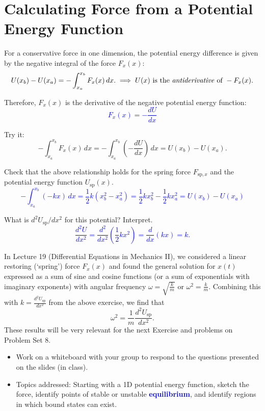 \documentclass[11pt, letterpaper, openany]{book}
\newenvironment{exercise}[1][Exercise]{%
  \tcolorbox[blanker, breakable, left=1em,
    before skip=1em, after skip=1em,
    borderline west={3pt}{0pt}{PhysNavy},
    colback=PhysCream,
    before upper={\textcolor{PhysNavy}{\sffamily\bfseries #1:}\space}
  ]%
}{%
  \endtcolorbox%
}
\begin{document}
\section*{Calculating Force from a Potential Energy Function}

For a conservative force in one dimension, the potential energy difference is given by the negative integral of the force $F_x(x)$:
\[ U(x_b) - U(x_a) = -\int_{x_a}^{x_b} F_x(x)\,dx. \implies U(x) \text{ is the \textit{antiderivative} of } -F_x(x). \]

Therefore, $F_x(x)$ is the derivative of the negative potential energy function:
\textcolor{blue}{\[ F_x(x) = -\frac{dU}{dx} \]}

Try it:
\[ -\int_{x_a}^{x_b} F_x(x)\,dx = -\int_{x_a}^{x_b} \left( -\frac{dU}{dx} \right)\,dx = U(x_b) - U(x_a). \]

\begin{exercise}[Exercise 3]
Check that the above relationship holds for the spring force $F_{\text{sp},x}$ and the potential energy function $U_{\text{sp}}(x)$. \\
\textcolor{blue}{
\[ -\int_{x_a}^{x_b} (-kx)\,dx = \frac{1}{2}k(x_b^2 - x_a^2) = \frac{1}{2}kx_b^2 - \frac{1}{2}kx_a^2 = U(x_b) - U(x_a) \]}

What is $d^2U_{\text{sp}}/dx^2$ for this potential? Interpret. \\
\textcolor{blue}{\[ \frac{d^2U}{dx^2} = \frac{d^2}{dx^2}\left(\frac{1}{2}kx^2\right) = \frac{d}{dx}(kx) = k. \]}
\end{exercise}

In Lecture 19 (Differential Equations in Mechanics II), we considered a linear restoring (`spring') force $F_x(x)$ and found the general solution for $x(t)$ expressed as a sum of sine and cosine functions (or a sum of exponentials with imaginary exponents) with angular frequency $\omega = \sqrt{\frac{k}{m}}$ or $\omega^2 = \frac{k}{m}$. Combining this with $k = \frac{d^2U_{\text{sp}}}{dx^2}$ from the above exercise, we find that
\[ \omega^2 = \frac{1}{m}\frac{d^2U_{\text{sp}}}{dx^2}. \]
These results will be very relevant for the next Exercise and problems on Problem Set 8.

\begin{exercise}[Exercise 4: Energy Diagrams for a 1D Conservative Potential]
\begin{itemize}
    \item Work on a whiteboard with your group to respond to the questions presented on the slides (in class).
    \item Topics addressed: Starting with a 1D potential energy function, sketch the force, identify points of stable or unstable \textbf{\textcolor{blue}{equilibrium}}, and identify regions in which bound states can exist.
\end{itemize}
\end{exercise}
\end{document}
